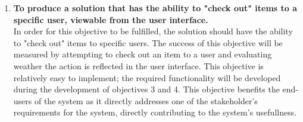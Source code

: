 \documentclass[../../../main.tex]{subfiles}
\begin{document}
\begin{enumerate}
  \item \textbf{To produce a solution that has the ability to "check out" items to a specific user, viewable from the user interface.}\\
        In order for this objective to be fulfilled, the solution should have the ability to "check out" items
        to specific users. The success of this objective will be measured by attempting to check out an item
        to a user and evaluating weather the action is reflected in the user interface.
        This objective is relatively easy to implement; the required functionality will be developed during the
        development of objectives 3 and 4. This objective benefits the end-users of the system as it directly addresses
        one of the stakeholder's requirements for the system, directly contributing to the system's usefullness.

\end{enumerate}

\begin{comment}
Tutor:
add quantifiable criteria for this objective

example quantifiable stuff:
large buttons
ability to to xyz (easily?)
launch the program
how will it work

stakeholder requirements may overlap with success requiremetns

GS:
Produce a system that manages inventory in a statistical and written/informative format
having the information automatically produce a graph
to clearly show when stock is low

to have a supplementary phone app that can be downloaded with the provision to
scan and check in/out items, stored in a database.

quantiative manner (numbers wise)
can update a spreadsheet automatically

able to be used remotely (T in SMART)

data inputted to the system will be processed within a time period to produce a usable outcome
(techy stuff goes here)

make use of qr scanning library to easily scan QR codes that will be placed on

display specific information about different items depending on their type
- number of inventory available
- highlight stock that is low

predict how much you are spending on consumables
eg. budgeting as an objective us ea library

asset value figure for budgeting
are you within the budget or not
\end{comment}
\end{document}
